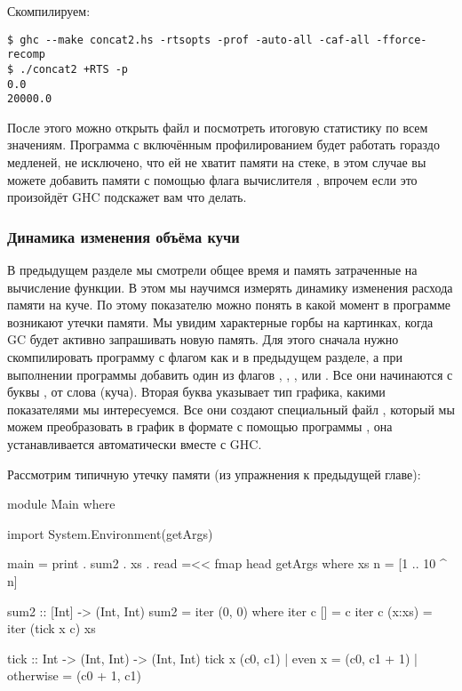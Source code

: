 Скомпилируем:


\begin{verbatim}
$ ghc --make concat2.hs -rtsopts -prof -auto-all -caf-all -fforce-recomp
$ ./concat2 +RTS -p
0.0
20000.0
\end{verbatim}

После этого можно открыть файл  и посмотреть итоговую
статистику по всем значениям. Программа с включённым профилированием
будет работать гораздо медленей, не исключено, что ей не хватит памяти
на стеке, в этом случае вы можете добавить памяти с помощью флага
вычислителя , впрочем если это произойдёт GHC подскажет вам что
делать.

\subsubsection{Динамика изменения объёма кучи}

В предыдущем разделе мы смотрели общее время и память затраченные на
вычисление функции. В этом мы научимся измерять динамику изменения
расхода памяти на куче. По этому показателю можно понять в какой момент
в программе возникают утечки памяти. Мы увидим характерные горбы на
картинках, когда GC будет активно запрашивать новую память. Для этого
сначала нужно скомпилировать программу с флагом  как и в
предыдущем разделе, а при выполнении программы добавить один из флагов
, , ,  или . Все они начинаются с
буквы , от слова  (куча). Вторая буква указывает тип
графика, какими показателями мы интересуемся. Все они создают
специальный файл , который мы можем преобразовать в
график в формате  с помощью программы , она
устанавливается автоматически вместе с GHC.

Рассмотрим типичную утечку памяти (из упражнения к предыдущей главе):


\begin{code}
module Main where

import System.Environment(getArgs)

main = print . sum2 . xs . read =<< fmap head getArgs  
    where xs n = [1 .. 10 ^ n]

sum2 :: [Int] -> (Int, Int)
sum2 = iter (0, 0)
    where iter c  []     = c
          iter c  (x:xs) = iter (tick x c) xs

tick :: Int -> (Int, Int) -> (Int, Int)
tick x (c0, c1) | even x    = (c0, c1 + 1)
                | otherwise = (c0 + 1, c1)
\end{code}

